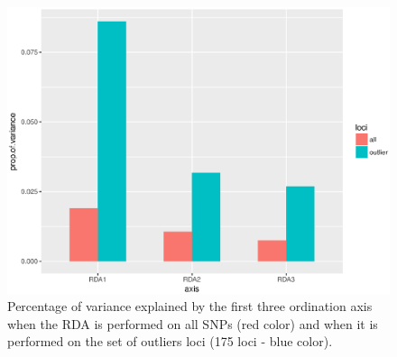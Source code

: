 \documentclass[a4paper,times,10pt,authoryear]{article}%
\begin{document}
\begin{figure}[t]
\begin{center}
\includegraphics[height=0.4\textheight]{figures/varexplainedPopulus.eps}
\end{center}
\caption{Percentage of variance explained by the first three ordination axis when the RDA is performed on all SNPs (red color) and when it is performed on the set of outliers loci (175 loci - blue color).}%
\label{fig:varexplainedPopulus}%
\end{figure}
\end{document}
